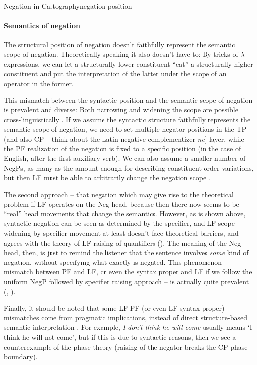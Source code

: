\documentclass[UTF8, a4paper, oneside, scheme=plain]{ctexrep}
\newcommand*{\citepage}[1]{p.~{#1}}
\newcommand{\corpus}[1]{\emph{#1}}
\newcommand{\translate}[1]{`#1'}
\begin{document}
\begin{theorybox}{Negation in Cartography}{negation-position}
    \paragraph*{Semantics of negation} 
    The structural position of negation 
    doesn't faithfully represent the semantic scope of negation.
    Theoretically speaking it also doesn't have to:
    By tricks of $\lambda$-expressions,
    we can let a structurally lower constituent 
    ``eat'' a structurally higher constituent
    and put the interpretation of the latter 
    under the scope of an operator in the former.

    This mismatch between the syntactic position and the semantic scope of negation 
    is prevalent and diverse: 
    Both narrowing and widening the scope are possible cross-linguistically
    \cite[\citepage{40}]{moscati2010negation}.
    If we assume the syntactic structure faithfully 
    represents the semantic scope of negation,
    we need to set multiple negator positions in the TP 
    (and also CP -- think about the Latin negative complementizer \corpus{ne})
    layer, while the PF realization of the negation is fixed to a specific position 
    (in the case of English, after the first auxiliary verb).
    We can also assume a smaller number of NegPs,
    as many as the amount enough for describing constituent order variations,
    but then LF must be able to arbitrarily change the negation scope \citep{moscati2012cartography}.

    The second approach -- that negation 
    which may give rise to the theoretical problem 
    if LF operates on the Neg head,
    because then there now seems to be ``real'' head movements that change the semantics.
    However, as is shown above, syntactic negation can be seen as determined by the specifier,
    and LF scope widening by specifier movement at least doesn't face theoretical barriers,
    and agrees with the theory of LF raising of quantifiers ().
    The meaning of the Neg head, then,
    is just to remind the listener that the sentence involves \emph{some} kind of negation,
    without specifying what exactly is negated.
    This phenomenon -- mismatch between PF and LF, 
    or even the syntax proper and LF 
    if we follow the uniform NegP followed by specifier raising approach --
    is actually quite prevalent (, ).

    Finally, it should be noted that some LF-PF (or even LF-syntax proper) mismatches 
    come from pragmatic implications, 
    instead of direct structure-based semantic interpretation
    \citep{zeijlstra2018does,crowley2019neg}.
    For example, \corpus{I don't think he will come} 
    usually means \translate{I think he will not come},
    but if this is due to syntactic reasons,
    then we see a counterexample of the phase theory 
    (raising of the negator breaks the CP phase boundary).
\end{theorybox}
\end{document}
